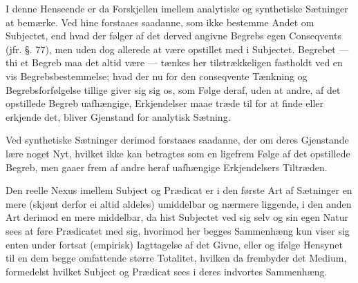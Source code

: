 \documentclass[12pt]{book}
\def\textit#1{#1}%
\def\emph#1{#1}%
\newcommand{\opage}[1]{\marginnote{\footnotesize\textit{[#1]}}}
\begin{document}
I denne Henseende er da Forskjellen imellem \emph{analytiske og synthetiske}
Sætninger at bemærke. Ved hine forstaaes saadanne, som ikke bestemme Andet om
Subjectet, end hvad der følger af det derved angivne Begrebs egen Conseqvents
(jfr. §. 77), men uden dog allerede at være opstillet med i Subjectet. Begrebet
--- thi et Begreb maa det altid være --- tænkes her tilstrækkeligen fastholdt ved
en vis Begrebsbestemmelse; hvad der nu for den conseqvente Tænkning og
Begrebsforfølgelse tillige giver sig sig os, som Følge deraf, uden at andre, af
det opstillede Begreb uafhængige, Erkjendelser maae
\opage{306} %
træde til for at finde eller erkjende det, bliver Gjenstand for analytisk
Sætning.

Ved synthetiske Sætninger derimod forstaaes saadanne, der om deres Gjenstande
lære noget Nyt, hvilket ikke kan betragtes som en ligefrem Følge af det
opstillede Begreb, men gaaer frem af andre heraf uafhængige Erkjendelsers
Tiltræden.

Den reelle Nexus imellem Subject og Prædicat er i den første Art af Sætninger en
mere (skjønt derfor ei altid aldeles) umiddelbar og nærmere liggende, i den
anden Art derimod en mere middelbar, da hist Subjectet ved sig selv og sin egen
Natur sees at føre Prædicatet med sig, hvorimod her begges Sammenhæng kun viser
sig enten under fortsat (empirisk) Iagttagelse af det Givne, eller og ifølge
Hensynet til en dem begge omfattende større Totalitet, hvilken da frembyder det
Medium, formedelst hvilket Subject og Prædicat sees i deres indvortes
Sammenhæng.
\end{document}
